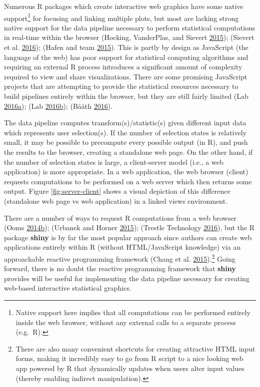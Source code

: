 \documentclass[12pt,]{isuthesis}
\let\rmarkdownfootnote\footnote%
\def\footnote{\protect\rmarkdownfootnote}
\begin{document}
Numerous R packages which create interactive web graphics have some
native support\footnote{Native support here implies that all
  computations can be performed entirely inside the web browser, without
  any external calls to a separate process (e.g.~R).} for focusing and
linking multiple plots, but most are lacking strong native support for
the data pipeline necessary to perform statistical computations in
real-time within the browser (Hocking, VanderPlas, and Sievert
\protect\hyperlink{ref-animint}{2015}); (Sievert et al.
\protect\hyperlink{ref-plotly}{2016}); (Hafen and team
\protect\hyperlink{ref-rbokeh}{2015}). This is partly by design as
JavaScript (the language of the web) has poor support for statistical
computing algorithms and requiring an external R process introduces a
significant amount of complexity required to view and share
visualizations. There are some promising JavaScript projects that are
attempting to provide the statistical resources necessary to build
pipelines entirely within the browser, but they are still fairly limited
(Lab
\protect\hyperlink{ref-datalib}{2016}\protect\hyperlink{ref-datalib}{a});
(Lab
\protect\hyperlink{ref-vega-dataflow}{2016}\protect\hyperlink{ref-vega-dataflow}{b});
(Bååth \protect\hyperlink{ref-bayes-js}{2016}).

The data pipeline computes transform(s)/statistic(s) given different
input data which represents user selection(s). If the number of
selection states is relatively small, it may be possible to precompute
every possible output (in R), and push the results to the browser,
creating a standalone web page. On the other hand, if the number of
selection states is large, a client-server model (i.e., a web
application) is more appropriate. In a web application, the web browser
(client) requests computations to be performed on a web server which
then returns some output. Figure \ref{fig:server-client} shows a visual
depiction of this difference (standalone web page vs web application) in
a linked views environment.

There are a number of ways to request R computations from a web browser
(Ooms
\protect\hyperlink{ref-opencpu}{2014}\protect\hyperlink{ref-opencpu}{b});
(Urbanek and Horner \protect\hyperlink{ref-FastRWeb}{2015}); (Trestle
Technology \protect\hyperlink{ref-plumber}{2016}), but the R package
\textbf{shiny} is by far the most popular approach since authors can
create web applications entirely within R (without HTML/JavaScript
knowledge) via an approachable reactive programming framework (Chang et
al. \protect\hyperlink{ref-shiny}{2015}).\footnote{There are also many
  convenient shortcuts for creating attractive HTML input forms, making
  it incredibly easy to go from R script to a nice looking web app
  powered by R that dynamically updates when users alter input values
  (thereby enabling indirect manipulation).} Going forward, there is no
doubt the reactive programming framework that \textbf{shiny} provides
will be useful for implementing the data pipeline necessary for creating
web-based interactive statistical graphics.
\end{document}
